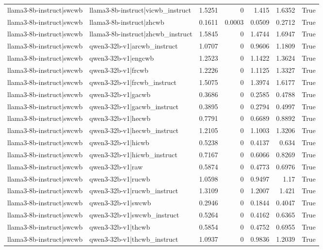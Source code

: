 \begin{table}
\begin{tabular}{l l r r r r l}
llama3-8b-instruct|swcwb & llama3-8b-instruct|vicwb_instruct & 1.5251 & 0 & 1.415 & 1.6352 & True \\
llama3-8b-instruct|swcwb & llama3-8b-instruct|zhcwb & 0.1611 & 0.0003 & 0.0509 & 0.2712 & True \\
llama3-8b-instruct|swcwb & llama3-8b-instruct|zhcwb_instruct & 1.5845 & 0 & 1.4744 & 1.6947 & True \\
llama3-8b-instruct|swcwb & qwen3-32b-v1|arcwb_instruct & 1.0707 & 0 & 0.9606 & 1.1809 & True \\
llama3-8b-instruct|swcwb & qwen3-32b-v1|engcwb & 1.2523 & 0 & 1.1422 & 1.3624 & True \\
llama3-8b-instruct|swcwb & qwen3-32b-v1|frcwb & 1.2226 & 0 & 1.1125 & 1.3327 & True \\
llama3-8b-instruct|swcwb & qwen3-32b-v1|frcwb_instruct & 1.5075 & 0 & 1.3974 & 1.6177 & True \\
llama3-8b-instruct|swcwb & qwen3-32b-v1|gacwb & 0.3686 & 0 & 0.2585 & 0.4788 & True \\
llama3-8b-instruct|swcwb & qwen3-32b-v1|gacwb_instruct & 0.3895 & 0 & 0.2794 & 0.4997 & True \\
llama3-8b-instruct|swcwb & qwen3-32b-v1|hecwb & 0.7791 & 0 & 0.6689 & 0.8892 & True \\
llama3-8b-instruct|swcwb & qwen3-32b-v1|hecwb_instruct & 1.2105 & 0 & 1.1003 & 1.3206 & True \\
llama3-8b-instruct|swcwb & qwen3-32b-v1|hicwb & 0.5238 & 0 & 0.4137 & 0.634 & True \\
llama3-8b-instruct|swcwb & qwen3-32b-v1|hicwb_instruct & 0.7167 & 0 & 0.6066 & 0.8269 & True \\
llama3-8b-instruct|swcwb & qwen3-32b-v1|raw & 0.5874 & 0 & 0.4773 & 0.6976 & True \\
llama3-8b-instruct|swcwb & qwen3-32b-v1|rucwb & 1.0598 & 0 & 0.9497 & 1.17 & True \\
llama3-8b-instruct|swcwb & qwen3-32b-v1|rucwb_instruct & 1.3109 & 0 & 1.2007 & 1.421 & True \\
llama3-8b-instruct|swcwb & qwen3-32b-v1|swcwb & 0.2946 & 0 & 0.1844 & 0.4047 & True \\
llama3-8b-instruct|swcwb & qwen3-32b-v1|swcwb_instruct & 0.5264 & 0 & 0.4162 & 0.6365 & True \\
llama3-8b-instruct|swcwb & qwen3-32b-v1|thcwb & 0.5854 & 0 & 0.4752 & 0.6955 & True \\
llama3-8b-instruct|swcwb & qwen3-32b-v1|thcwb_instruct & 1.0937 & 0 & 0.9836 & 1.2039 & True \\

\end{tabular}
\end{table}

